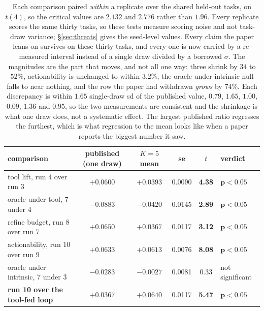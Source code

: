 \documentclass[11pt]{article}
\begin{document}
\begin{table}[h]
\centering
\small
\begin{tabular}{lccccl}
\toprule
comparison & published (one draw) & $K{=}5$ mean & se & $t$ & verdict \\
\midrule
tool lift, run 4 over run 3      & $+0.0600$ & $+0.0393$ & 0.0090 & \textbf{4.38} & $\mathbf{p<0.05}$ \\
oracle under tool, 7 under 4     & $-0.0883$ & $-0.0420$ & 0.0145 & \textbf{2.89} & $\mathbf{p<0.05}$ \\
refine budget, run 8 over run 7  & $+0.0650$ & $+0.0367$ & 0.0117 & \textbf{3.12} & $\mathbf{p<0.05}$ \\
actionability, run 10 over run 9 & $+0.0633$ & $+0.0613$ & 0.0076 & \textbf{8.08} & $\mathbf{p<0.05}$ \\
oracle under intrinsic, 7 under 3 & $-0.0283$ & $-0.0027$ & 0.0081 & 0.33 & not significant \\
\textbf{run 10 over the tool-fed loop} & $+0.0367$ & $\mathbf{+0.0640}$ & 0.0117 & \textbf{5.47} & $\mathbf{p<0.05}$ \\
\bottomrule
\end{tabular}
\caption{Each comparison paired \emph{within} a replicate over the shared held-out tasks, on
$t(4)$, so the critical values are $2.132$ and $2.776$ rather than $1.96$. Every replicate scores
the same thirty tasks, so these tests measure scoring noise and not task-draw variance;
\S\ref{sec:threats} gives the seed-level values. Every claim the paper
leans on survives on these thirty tasks, and every one is now carried by a re-measured interval
instead of a single draw divided by a borrowed $\sigma$. The magnitudes are the part that moves, and not all one way:
three shrink by $34$ to $52\%$, actionability is unchanged to within $3.2\%$, the
oracle-under-intrinsic null falls to near nothing, and the row the paper had withdrawn \emph{grows}
by $74\%$. Each discrepancy is within $1.65$ single-draw sd of the published value, $0.79$, $1.65$,
$1.00$, $0.09$, $1.36$ and $0.95$, so the two measurements are consistent and the shrinkage is
what one draw does, not a systematic effect. The largest published ratio regresses the furthest,
which is what regression to the mean looks like when a paper reports the biggest number it saw.}
\label{tab:curvepairs}
\end{table}
\end{document}
